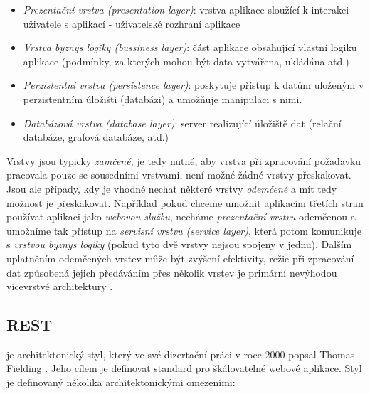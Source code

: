 \begin{itemize}
  \item{\textit{Prezentační vrstva (presentation layer)}}: vrstva aplikace sloužící k interakci uživatele s aplikací - uživatelské rozhraní aplikace
  \item{\textit{Vrstva byznys logiky (bussiness layer)}}: část aplikace obsahující vlastní logiku aplikace (podmínky, za kterých mohou být data vytvářena, ukládána atd.)
  \item{\textit{Perzistentní vrstva (persistence layer)}}: poskytuje přístup k datům uloženým v perzistentním úložišti (databázi) a umožňuje manipulaci s nimi.
  \item{\textit{Databázová vrstva (database layer)}}: server realizující úložiště dat (relační databáze, grafová databáze, atd.)
\end{itemize}

Vrstvy jsou typicky \textit{zamčené}, je tedy nutné, aby vrstva při zpracování požadavku pracovala pouze se sousedními vrstvami, není možné žádné vrstvy přeskakovat. Jsou ale případy, kdy je vhodné nechat některé vrstvy \textit{odemčené} a mít tedy možnost je přeskakovat. Například pokud chceme umožnit aplikacím třetích stran používat aplikaci jako \textit{webovou službu}, necháme \textit{prezentační vrstvu} odemčenou a umožníme tak přístup na \textit{servisní vrstvu (service layer)}, která potom komunikuje s \textit{vrstvou byznys logiky} (pokud tyto dvě vrstvy nejsou spojeny v jednu). Dalším uplatněním odemčených vrstev může být zvýšení efektivity, režie při zpracování dat způsobená  jejich předáváním přes několik vrstev je primární nevýhodou vícevrstvé architektury \cite{Clark90}.

\subsection{REST}
\label{sec:rest}
\textit{} je architektonický styl, který ve své dizertační práci v roce 2000 popsal Thomas Fielding \cite{Fielding00}. Jeho cílem je definovat standard pro škálovatelné webové aplikace. Styl je definovaný několika architektonickými omezeními:


